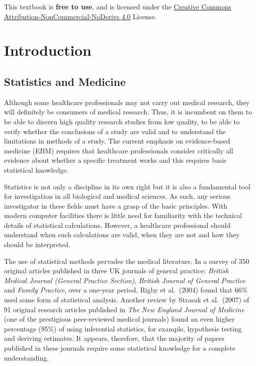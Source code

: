 \documentclass[
  16pt,
  letterpaper,
]{scrbook}
\begin{document}
This textbook is \textbf{free to use}, and is licensed under the
\href{https://creativecommons.org/licenses/by-nc-nd/4.0/}{Creative
Commons Attribution-NonCommercial-NoDerivs 4.0} License.


\hypertarget{introduction}{%
\chapter{Introduction}\label{introduction}}

\hypertarget{statistics-and-medicine}{%
\section{Statistics and Medicine}\label{statistics-and-medicine}}

Although some healthcare professionals may not carry out medical
research, they will definitely be consumers of medical research. Thus,
it is incumbent on them to be able to discern high quality research
studies from low quality, to be able to verify whether the conclusions
of a study are valid and to understand the limitations in methods of a
study. The current emphasis on evidence-based medicine (EBM) requires
that healthcare professionals consider critically all evidence about
whether a specific treatment works and this requires basic statistical
knowledge.

Statistics is not only a discipline in its own right but it is also a
fundamental tool for investigation in all biological and medical
sciences. As such, any serious investigator in these fields must have a
grasp of the basic principles. With modern computer facilities there is
little need for familiarity with the technical details of statistical
calculations. However, a healthcare professional should understand when
such calculations are valid, when they are not and how they should be
interpreted.

The use of statistical methods pervades the medical literature. In a
survey of 350 original articles published in three UK journals of
general practice: \emph{British Medical Journal (General Practice
Section)}, \emph{British Journal of General Practice} and \emph{Family
Practice}, over a one-year period, Rigby et al.~(2004) found that 66\%
used some form of statistical analysis. Another review by Strasak et
al.~(2007) of 91 original research articles published in \emph{The New
England Journal of Medicine} (one of the prestigious peer-reviewed
medical journals) found an even higher percentage (95\%) of using
inferential statistics, for example, hypothesis testing and deriving
estimates. It appears, therefore, that the majority of papers published
in these journals require some statistical knowledge for a complete
understanding.
\end{document}
